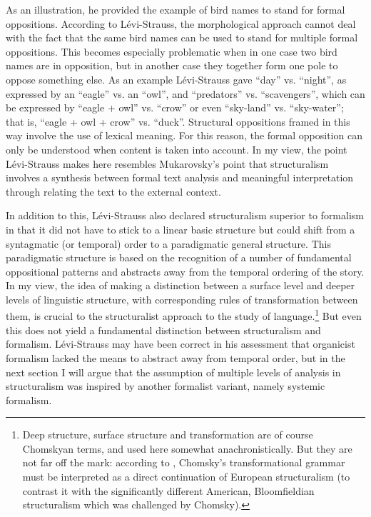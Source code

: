 \documentclass[output=paper]{langscibook}
\begin{document}
As an illustration, he provided the example of bird names to stand for formal oppositions. According to Lévi-Strauss, the morphological approach cannot deal with the fact that the same bird names can be used to stand for multiple formal oppositions. This becomes especially problematic when in one case two bird names are in opposition, but in another case they together form one pole to oppose something else. As an example Lévi-Strauss gave ``day'' vs. ``night'', as expressed by an ``eagle'' vs. an ``owl'', and ``predators'' vs. ``scavengers'', which can be expressed by ``eagle + owl'' vs. ``crow'' or even ``sky-land'' vs. ``sky-water''; that is, ``eagle + owl + crow'' vs. ``duck''. Structural oppositions framed in this way involve the use of lexical meaning. For this reason, the formal opposition can only be understood when content is taken into account. In my view, the point Lévi-Strauss makes here resembles Mukarovsky's point that structuralism involves a synthesis between formal text analysis and meaningful interpretation through relating the text to the external context.

In addition to this, Lévi-Strauss also declared structuralism superior to formalism in that it did not have to stick to a linear basic structure but could shift from a syntagmatic (or temporal) order to a paradigmatic general structure. This paradigmatic structure is based on the recognition of a number of fundamental oppositional patterns and abstracts away from the temporal ordering of the story. In my view, the idea of making a distinction between a surface level and deeper levels of linguistic structure, with corresponding rules of transformation between them, is crucial to the structuralist approach to the study of language.\footnote{Deep structure, surface structure and transformation are of course Chomskyan terms, and used here somewhat anachronistically. But they are not far off the mark: according to \citet[1899--1900]{Joseph2001}, Chomsky's transformational grammar must be interpreted as a direct continuation of European structuralism (to contrast it with the significantly different American, Bloomfieldian structuralism which was challenged by Chomsky).} But even this does not yield a fundamental distinction between structuralism and formalism. Lévi-Strauss may have been correct in his assessment that organicist formalism lacked the means to abstract away from temporal order, but in the next section I will argue that the assumption of multiple levels of analysis in structuralism was inspired by another formalist variant, namely systemic formalism. 
\end{document}

